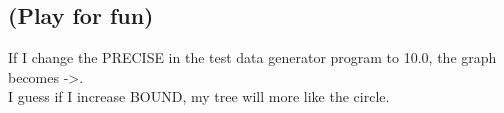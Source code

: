 \documentclass[fleqn,a4paper,12pt]{article}
\begin{document}
\begin{enumerate}
\subsection{(Play for fun)}

  \begin{minipage}[r]{7cm}
    If I change the PRECISE in the test data generator program to 10.0, the graph becomes ->.\\
    I guess if I increase BOUND, my tree will more like the circle.
  \end{minipage}
  \hfill
  \begin{minipage}[r]{7cm}
\end{minipage}
\end{enumerate}
\end{document}
